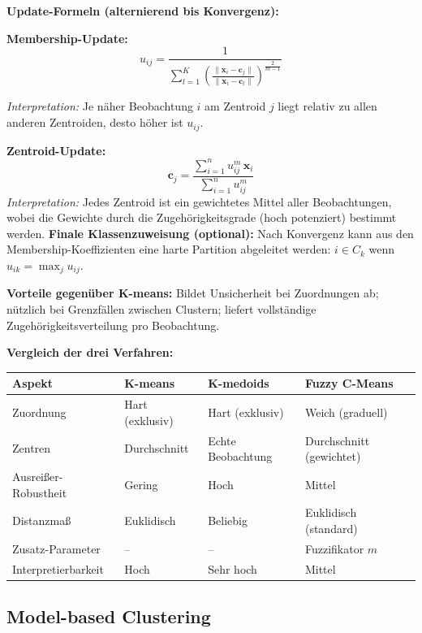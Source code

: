 \textbf{Update-Formeln (alternierend bis Konvergenz):}

\textbf{Membership-Update:} $$u_{ij} = \frac{1}{\displaystyle\sum_{l=1}^{K} \left(\frac{\|\mathbf{x}_i - \mathbf{c}_j\|} {\|\mathbf{x}_i - \mathbf{c}_l\|}\right)^{\!\frac{2}{m-1}}}$$

\textit{Interpretation:} Je näher Beobachtung $i$ am Zentroid $j$ liegt relativ zu allen anderen Zentroiden, desto höher ist $u_{ij}$.

\textbf{Zentroid-Update:} $$\mathbf{c}_j = \frac{\sum_{i=1}^{n} u_{ij}^m\, \mathbf{x}_i} {\sum_{i=1}^{n} u_{ij}^m}$$ \textit{Interpretation:} Jedes Zentroid ist ein gewichtetes Mittel aller Beobachtungen, wobei die Gewichte durch die Zugehörigkeitsgrade (hoch potenziert) bestimmt werden. \textbf{Finale Klassenzuweisung (optional):} Nach Konvergenz kann aus den Membership-Koeffizienten eine harte Partition abgeleitet werden: $i \in C_k$ wenn $u_{ik} = \max_j u_{ij}$.

\textbf{Vorteile gegenüber K-means:} Bildet Unsicherheit bei Zuordnungen ab; nützlich bei Grenzfällen zwischen Clustern; liefert vollständige Zugehörigkeitsverteilung pro Beobachtung.

\textbf{Vergleich der drei Verfahren:}
\begin{table}[h]
    \centering
    \small
    \begin{tabular}{|l|l|l|l|}
        \hline
        \textbf{Aspekt} & \textbf{K-means} & \textbf{K-medoids} &
        \textbf{Fuzzy C-Means} \\
        \hline
        Zuordnung & Hart (exklusiv) & Hart (exklusiv) & Weich (graduell) \\
        \hline
        Zentren & Durchschnitt & Echte Beobachtung & Durchschnitt (gewichtet) \\
        \hline
        Ausreißer-Robustheit & Gering & Hoch & Mittel \\
        \hline
        Distanzmaß & Euklidisch & Beliebig & Euklidisch (standard) \\
        \hline
        Zusatz-Parameter & -- & -- & Fuzzifikator $m$ \\
        \hline
        Interpretierbarkeit & Hoch & Sehr hoch & Mittel \\
        \hline
    \end{tabular}
\end{table}

\subsection{Model-based Clustering}


